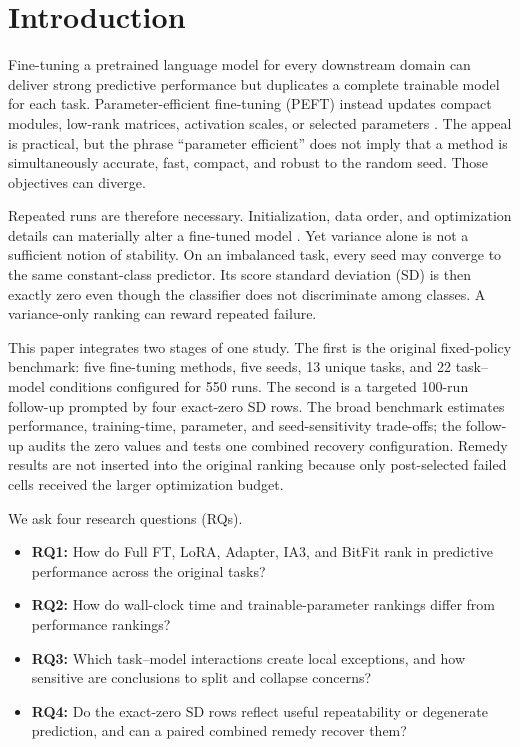 \documentclass{SPC}
\begin{document}
\section{Introduction}

Fine-tuning a pretrained language model for every downstream domain can deliver strong predictive performance but duplicates a complete trainable model for each task. Parameter-efficient fine-tuning (PEFT) instead updates compact modules, low-rank matrices, activation scales, or selected parameters \cite{5,6,7,8,21}. The appeal is practical, but the phrase ``parameter efficient'' does not imply that a method is simultaneously accurate, fast, compact, and robust to the random seed. Those objectives can diverge.

Repeated runs are therefore necessary. Initialization, data order, and optimization details can materially alter a fine-tuned model \cite{9,10,17,18,19}. Yet variance alone is not a sufficient notion of stability. On an imbalanced task, every seed may converge to the same constant-class predictor. Its score standard deviation (SD) is then exactly zero even though the classifier does not discriminate among classes. A variance-only ranking can reward repeated failure.

This paper integrates two stages of one study. The first is the original fixed-policy benchmark: five fine-tuning methods, five seeds, 13 unique tasks, and 22 task--model conditions configured for 550 runs. The second is a targeted 100-run follow-up prompted by four exact-zero SD rows. The broad benchmark estimates performance, training-time, parameter, and seed-sensitivity trade-offs; the follow-up audits the zero values and tests one combined recovery configuration. Remedy results are not inserted into the original ranking because only post-selected failed cells received the larger optimization budget.

We ask four research questions (RQs).

\begin{itemize}
\item \textbf{RQ1:} How do Full FT, LoRA, Adapter, IA3, and BitFit rank in predictive performance across the original tasks?
\item \textbf{RQ2:} How do wall-clock time and trainable-parameter rankings differ from performance rankings?
\item \textbf{RQ3:} Which task--model interactions create local exceptions, and how sensitive are conclusions to split and collapse concerns?
\item \textbf{RQ4:} Do the exact-zero SD rows reflect useful repeatability or degenerate prediction, and can a paired combined remedy recover them?
\end{itemize}
\end{document}
